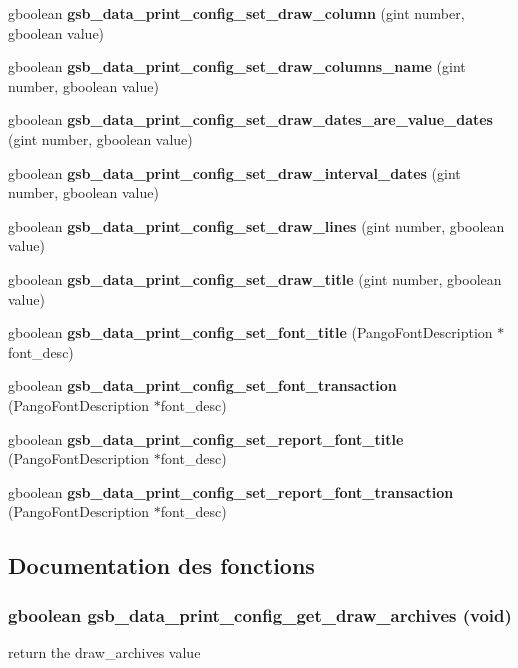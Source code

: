 \begin{DoxyCompactItemize}
\item 
gboolean {\bf gsb\_\-data\_\-print\_\-config\_\-set\_\-draw\_\-column} (gint number, gboolean value)
\item 
gboolean {\bf gsb\_\-data\_\-print\_\-config\_\-set\_\-draw\_\-columns\_\-name} (gint number, gboolean value)
\item 
gboolean {\bf gsb\_\-data\_\-print\_\-config\_\-set\_\-draw\_\-dates\_\-are\_\-value\_\-dates} (gint number, gboolean value)
\item 
gboolean {\bf gsb\_\-data\_\-print\_\-config\_\-set\_\-draw\_\-interval\_\-dates} (gint number, gboolean value)
\item 
gboolean {\bf gsb\_\-data\_\-print\_\-config\_\-set\_\-draw\_\-lines} (gint number, gboolean value)
\item 
gboolean {\bf gsb\_\-data\_\-print\_\-config\_\-set\_\-draw\_\-title} (gint number, gboolean value)
\item 
gboolean {\bf gsb\_\-data\_\-print\_\-config\_\-set\_\-font\_\-title} (PangoFontDescription $\ast$font\_\-desc)
\item 
gboolean {\bf gsb\_\-data\_\-print\_\-config\_\-set\_\-font\_\-transaction} (PangoFontDescription $\ast$font\_\-desc)
\item 
gboolean {\bf gsb\_\-data\_\-print\_\-config\_\-set\_\-report\_\-font\_\-title} (PangoFontDescription $\ast$font\_\-desc)
\item 
gboolean {\bf gsb\_\-data\_\-print\_\-config\_\-set\_\-report\_\-font\_\-transaction} (PangoFontDescription $\ast$font\_\-desc)
\end{DoxyCompactItemize}


\subsection{Documentation des fonctions}
\subsubsection[{gsb\_\-data\_\-print\_\-config\_\-get\_\-draw\_\-archives}]{\setlength{\rightskip}{0pt plus 5cm}gboolean gsb\_\-data\_\-print\_\-config\_\-get\_\-draw\_\-archives (void)}\label{gsb__data__print__config_8h_a6e773923f44e66e6e047ec8bd6bbdb21}
return the draw\_\-archives value


